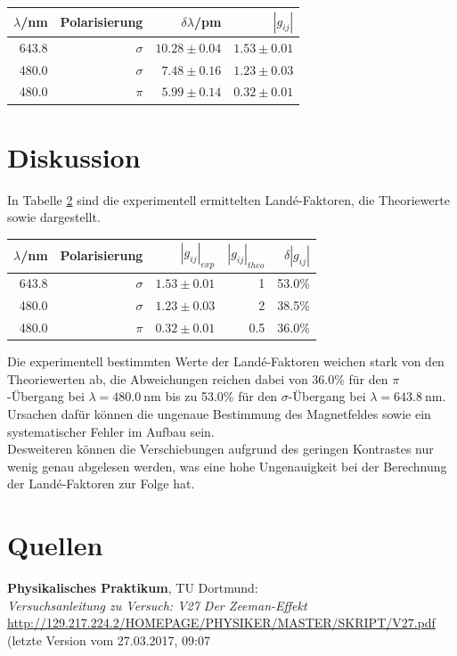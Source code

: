 \documentclass[captions=tableheading]{scrartcl}
\begin{document}
\begin{table}[H]
	\centering
	\label{tab:lande}
	\begin{tabular}{r r r r}
		\toprule
		$\lambda$/nm & Polarisierung & $\delta \lambda$/pm & $\left| g_{ij}\right|$ \\
		\midrule
		643.8 & $\sigma$ & $10.28\pm0.04$ & $1.53\pm0.01$ \\
		480.0 & $\sigma$ & $ 7.48\pm0.16$ & $1.23\pm0.03$ \\
		480.0 & $\pi$	 & $ 5.99\pm0.14$ & $0.32\pm0.01$ \\
		\bottomrule
	\end{tabular}
\end{table}
		
\section{Diskussion}
In Tabelle \ref{tab:literatur} sind die experimentell ermittelten Landé-Faktoren, die Theoriewerte sowie   dargestellt.
\begin{table}[H]
	\centering
	\label{tab:literatur}
	\begin{tabular}{r r r r r}
		\toprule
		$\lambda$/nm & Polarisierung & $\left| g_{ij}\right|_{exp}$ & $\left| g_{ij}\right|_{theo}$ & $\delta \left|g_{ij}\right|$ \\
		\midrule
		643.8 & $\sigma$ &  $1.53\pm0.01$ & 1 & 53.0\% \\
		480.0 & $\sigma$ &  $1.23\pm0.03$ & 2 & 38.5\% \\
		480.0 & $\pi$	 &  $0.32\pm0.01$ & 0.5 & 36.0\% \\
		\bottomrule
	\end{tabular}
\end{table}
Die experimentell bestimmten Werte der Landé-Faktoren weichen stark von den Theoriewerten ab, die Abweichungen reichen dabei von 36.0\% für den $\pi$-Übergang bei $\lambda=\SI{480.0}{\nano\metre}$ bis zu 53.0\% für den $\sigma$-Übergang bei $\lambda=\SI{643.8}{\nano\metre}$. Ursachen dafür können die ungenaue Bestimmung des Magnetfeldes sowie ein systematischer Fehler im Aufbau sein. \\
Desweiteren können die Verschiebungen aufgrund des geringen Kontrastes nur wenig genau abgelesen werden, was eine hohe Ungenauigkeit bei der Berechnung der Landé-Faktoren zur Folge hat.

\section{Quellen}
\begin{enumerate}[label={[\arabic*]}]
\item \label{q:anleitung} \textbf{Physikalisches Praktikum}, TU Dortmund: \\
\textit{Versuchsanleitung zu Versuch: V27 Der Zeeman-Effekt} \\
\url{http://129.217.224.2/HOMEPAGE/PHYSIKER/MASTER/SKRIPT/V27.pdf} (letzte Version vom 27.03.2017, 09:07
\end{enumerate}
\end{document}

